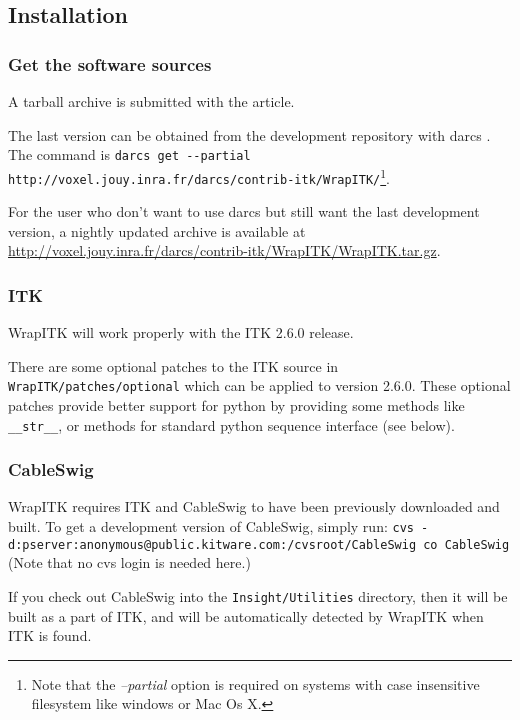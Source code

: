 \documentclass{InsightArticle}
\begin{document}
  \subsection{Installation}

    \subsubsection{Get the software sources}

A tarball archive is submitted with the article.

The last version can be obtained from the development repository with darcs \cite{DarcsWebSite}.
The command is
\verb$darcs get --partial http://voxel.jouy.inra.fr/darcs/contrib-itk/WrapITK/$\footnote{Note
that the {\em --partial} option is required on systems with case insensitive filesystem like
windows or Mac Os X.}.

For the user who don't want to use darcs \cite{DarcsWebSite} but still want the last development version,
a nightly updated archive is available at
\url{http://voxel.jouy.inra.fr/darcs/contrib-itk/WrapITK/WrapITK.tar.gz}.

    \subsubsection{ITK}

WrapITK will work properly with the ITK 2.6.0 release. 

There are some optional
patches to the ITK source in \verb$WrapITK/patches/optional$ which can be applied to
version 2.6.0. These optional patches provide
better support for python by providing some methods like \verb$__str__$, or methods
for standard python sequence interface (see below).

    \subsubsection{CableSwig}

WrapITK requires ITK and CableSwig \cite{ITKWebSite} to have been previously downloaded and built.
To get a development version of CableSwig, simply run:
\verb$cvs -d:pserver:anonymous@public.kitware.com:/cvsroot/CableSwig co CableSwig$
(Note that no cvs login is needed here.)

If you check out CableSwig into the \verb$Insight/Utilities$ directory, then it will be
built as a part of ITK, and will be automatically detected by WrapITK when ITK
is found.
\end{document}
